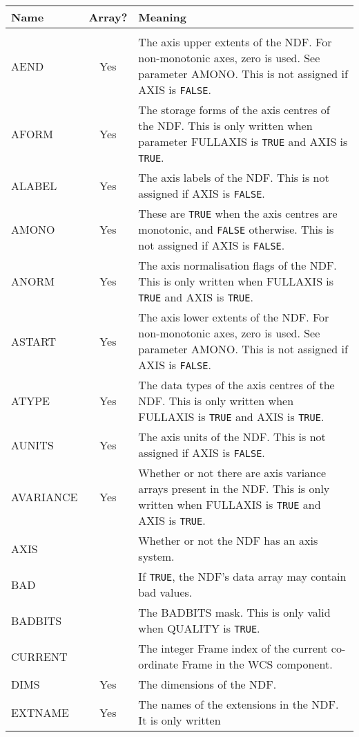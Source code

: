 \documentclass[twoside,11pt]{article}
\begin{document}
\newpage
\begin{center}
\begin{tabular}{lcp{112mm}}
Name & Array? & Meaning \\ \hline
\\
AEND & Yes & The axis upper extents of the NDF.  For non-monotonic axes,
             zero is used.  See parameter AMONO.  This is not assigned if
             AXIS is {\tt FALSE}. \\
AFORM & Yes & The storage forms of the axis centres of the NDF.  This is
              only written when parameter FULLAXIS is {\tt TRUE} and AXIS
              is {\tt TRUE}. \\
ALABEL & Yes & The axis labels of the NDF.  This is not assigned if AXIS is
               {\tt FALSE}. \\
AMONO & Yes &  These are {\tt TRUE} when the axis centres are monotonic, and {\tt FALSE}
               otherwise.  This is not assigned if AXIS is {\tt FALSE}. \\
ANORM & Yes &  The axis normalisation flags of the NDF.  This is only written
               when FULLAXIS is {\tt TRUE} and AXIS is {\tt TRUE}. \\
ASTART & Yes &  The axis lower extents of the NDF.  For non-monotonic axes,
                zero is used.  See parameter AMONO.  This is not assigned if
                AXIS is {\tt FALSE}. \\
ATYPE & Yes & The data types of the axis centres of the NDF.  This is only
              written when FULLAXIS is {\tt TRUE} and AXIS is {\tt TRUE}. \\
AUNITS & Yes & The axis units of the NDF.  This is not assigned if AXIS is
               {\tt FALSE}. \\
AVARIANCE & Yes & Whether or not there are axis variance arrays present in the
                  NDF.  This is only written when FULLAXIS is {\tt TRUE} and AXIS is
                  {\tt TRUE}.\\
AXIS & & Whether or not the NDF has an axis system. \\
BAD & & If {\tt TRUE}, the NDF's data array may contain bad values. \\
BADBITS & & The BADBITS mask.  This is only valid when QUALITY is {\tt TRUE}. \\
CURRENT & &  The integer Frame index of the current co-ordinate Frame
             in the WCS component. \\
DIMS & Yes & The dimensions of the NDF. \\
EXTNAME & Yes & The names of the extensions in the NDF.  It is only written

\end{tabular}
\end{center}
\end{document}
